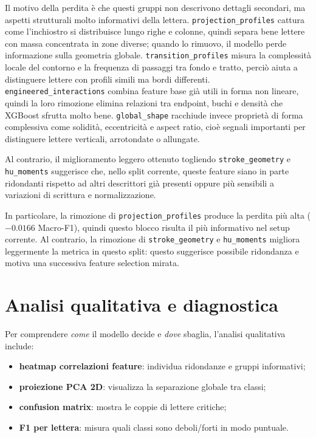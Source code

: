 \documentclass[a4paper,12pt]{article}
\begin{document}
Il motivo della perdita è che questi gruppi non descrivono dettagli secondari, ma aspetti strutturali molto informativi della lettera.
\texttt{projection\_profiles} cattura come l'inchiostro si distribuisce lungo righe e colonne, quindi separa bene lettere con massa concentrata in zone diverse; quando lo rimuovo, il modello perde informazione sulla geometria globale.
\texttt{transition\_profiles} misura la complessità locale del contorno e la frequenza di passaggi tra fondo e tratto, perciò aiuta a distinguere lettere con profili simili ma bordi differenti.
\texttt{engineered\_interactions} combina feature base già utili in forma non lineare, quindi la loro rimozione elimina relazioni tra endpoint, buchi e densità che XGBoost sfrutta molto bene.
\texttt{global\_shape} racchiude invece proprietà di forma complessiva come solidità, eccentricità e aspect ratio, cioè segnali importanti per distinguere lettere verticali, arrotondate o allungate.

Al contrario, il miglioramento leggero ottenuto togliendo \texttt{stroke\_geometry} e \texttt{hu\_moments} suggerisce che, nello split corrente, queste feature siano in parte ridondanti rispetto ad altri descrittori già presenti oppure più sensibili a variazioni di scrittura e normalizzazione.

In particolare, la rimozione di \texttt{projection\_profiles} produce la perdita più alta (\(-0.0166\) Macro-F1), quindi questo blocco risulta il più informativo nel setup corrente. Al contrario, la rimozione di \texttt{stroke\_geometry} e \texttt{hu\_moments} migliora leggermente la metrica in questo split: questo suggerisce possibile ridondanza e motiva una successiva feature selection mirata.


\section{Analisi qualitativa e diagnostica}
Per comprendere \textit{come} il modello decide e \textit{dove} sbaglia, l'analisi qualitativa include:
\begin{itemize}[leftmargin=1.5em]
  \item \textbf{heatmap correlazioni feature}: individua ridondanze e gruppi informativi;
  \item \textbf{proiezione PCA 2D}: visualizza la separazione globale tra classi;
  \item \textbf{confusion matrix}: mostra le coppie di lettere critiche;
  \item \textbf{F1 per lettera}: misura quali classi sono deboli/forti in modo puntuale.
\end{itemize}
\end{document}
